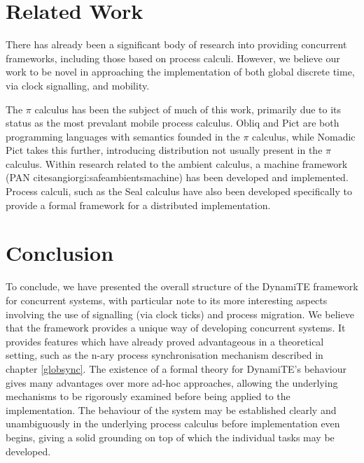 \section{Related Work}
\label{dyn:relatedwork}

There has already been a significant body of research into providing
concurrent frameworks, including those based on process calculi.
However, we believe our work to be novel in approaching the
implementation of both global discrete time, via clock signalling, and
mobility.

The $\pi$ calculus has been the subject of much of this work, primarily
due to its status as the most prevalant mobile process calculus.  Obliq
\cite{obliq} and Pict \cite{daveturner:phd} are both programming
languages with semantics founded in the $\pi$ calculus, while Nomadic
Pict \cite{wojciechowski:phd} takes this further, introducing
distribution not usually present in the $\pi$ calculus.  Within research
related to the ambient calculus, a machine framework (PAN
cite{sangiorgi:safeambientsmachine}) has been developed and
implemented.  Process calculi, such as the Seal calculus \cite{seal}
have also been developed specifically to provide a formal framework for
a distributed implementation.

\section{Conclusion}

To conclude, we have presented the overall structure of the DynamiTE
framework for concurrent systems, with particular note to its more
interesting aspects involving the use of signalling (via clock ticks)
and process migration.  We believe that the framework provides a
unique way of developing concurrent systems.  It provides features
which have already proved advantageous in a theoretical setting, such
as the n-ary process synchronisation mechanism described in chapter
\ref{globsync}.  The existence of a formal theory for DynamiTE's
behaviour gives many advantages over more ad-hoc approaches, allowing
the underlying mechanisms to be rigorously examined before being
applied to the implementation.  The behaviour of the system may be
established clearly and unambiguously in the underlying process
calculus before implementation even begins, giving a solid grounding
on top of which the individual tasks may be developed.

